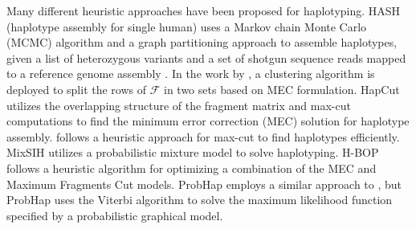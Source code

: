Many different heuristic approaches have been proposed for haplotyping.
HASH (haplotype assembly for single human) uses a Markov chain Monte Carlo (MCMC) algorithm and a graph partitioning approach to assemble haplotypes,
given a list of heterozygous variants and a set of shotgun sequence reads mapped to a reference genome assembly \citep{bansal2008mcmc}. 
In the work by \cite{wang2007clustering}, a clustering algorithm is deployed to split the rows of $\mathcal{F}$ in two sets based on MEC formulation.
HapCut \citep{Bansal2008} utilizes the overlapping structure of the fragment matrix and max-cut computations to find the minimum error correction (MEC) solution for haplotype assembly. 
\cite{Duitama2010} follows a heuristic approach for max-cut to find haplotypes efficiently. 
MixSIH \citep{matsumoto2013mixsih} utilizes a probabilistic mixture model to solve haplotyping.
H-BOP \citep{xie2012fast} follows a heuristic algorithm for optimizing a combination of the MEC and Maximum Fragments Cut models.
ProbHap \citep{Kuleshov2014b} employs a similar approach to \cite{Patterson2015}, but ProbHap uses the Viterbi algorithm to solve the maximum likelihood function specified by a probabilistic graphical model. 
